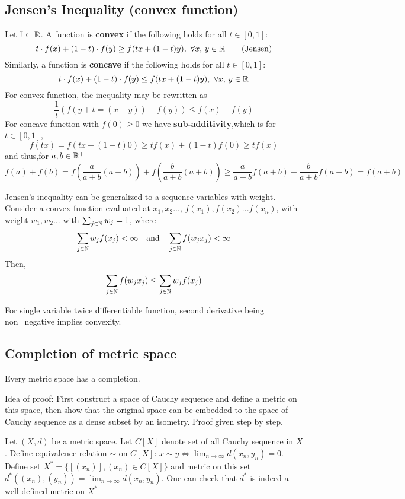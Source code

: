 \documentclass{article}
\begin{document}
\subsection{Jensen's Inequality (convex function)}\label{Jensen's inquality}
Let $\mathbb{I}\subset \mathbb{R}$. A function  is {\bf convex} if the following holds for all $t\in[0,1]$:
$$
	t\cdot f(x)+(1-t)\cdot f(y)\geq f(tx+(1-t)y),\,\,\forall x,\,y\in \mathbb{R}\quad\quad\text{(Jensen)}
$$
Similarly,  a function  is {\bf concave} if the following holds for all $t\in[0,1]$:
$$
	t\cdot f(x)+(1-t)\cdot f(y)\leq f(tx+(1-t)y),\,\,\forall x,\,y\in \mathbb{R}
$$
For convex function, the inequality may be rewritten as
$$
	\frac{1}{t}(f(y+t
	=(x-y))-f(y))\leq f(x)-f(y)
$$
For concave function with $f(0)\geq 0$ we have {\bf sub-additivity},which is for $t\in[0,1]$,
$$
	f(tx)=f(tx+(1-t)0)\geq tf(x)+(1-t)f(0)\geq tf(x)
$$
and thus,for $a,b\in\mathbb{R}^+$
$$
	f(a)+f(b)=f(\frac{a}{a+b}(a+b))+f(\frac{b}{a+b}(a+b))\geq \frac{a}{a+b}f(a+b)+\frac{b}{a+b}f(a+b)=f(a+b)
$$

\begin{remark}\rm\nextline
	Jensen's inequality can be generalized to a sequence variables with weight. Consider a convex function evaluated at $x_1,x_2...$, $f(x_1),f(x_2)...f(x_n)$, with weight $w_1,w_2...$ with $\sum_{j\in\mathbb{N}}w_j=1$, where
	$$
		\sum_{j\in\mathbb{N}}w_j f(x_j)<\infty \quad\text{and}\quad
		\sum_{j\in\mathbb{N}} f(w_jx_j)<\infty
	$$
	Then,
	$$
		\sum_{j\in\mathbb{N}} f(w_jx_j)\leq\sum_{j\in\mathbb{N}}w_j f(x_j)
	$$
\end{remark}

\begin{remark}[$f''>0$]\rm\nextline
	For single variable twice differentiable function, second derivative being non=negative implies convexity.
\end{remark}


\subsection{Completion of metric space}\label{completion of metric space}


\begin{theorem}\rm\nextline
	Every metric space has a completion.

\end{theorem}
Idea of proof: First construct a space of Cauchy sequence and define a metric on this space, then show that the original space can be embedded to the space of Cauchy sequence as a dense subset by an isometry. Proof given step by step.\\
\begin{lemma}\rm\nextline
	Let $(X,d)$ be a metric space. Let $C[X]$ denote set of all Cauchy sequence in $X$. Define equivalence relation $\sim$ on $C[X]$:
	$x\sim y\iff \lim_{n\to\infty}d(x_n,y_n)=0$. Define set $X^*=\{[(x_n)],(x_n)\in C[X]\}$ and metric on this set $d^*((x_n),(y_n))=\lim_{n\to\infty}d(x_n,y_n)$. One can check that $d^*$ is indeed a well-defined metric on $X^*$
\end{lemma}
\end{document}

